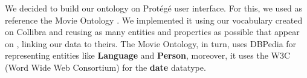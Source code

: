 We decided to build our ontology on Protégé user interface. For this, we used as reference the Movie Ontology \cite{movieontology}. We implemented it using our vocabulary created on Collibra and reusing as many entities and properties as possible that appear on \cite{movieontology}, linking our data to theirs. The Movie Ontology, in turn, uses DBPedia \cite{dbpedia} for representing entities like \textbf{Language} and \textbf{Person}, moreover, it uses the W3C (Word Wide Web Consortium) \cite{w3c} for the \textbf{date} datatype.

